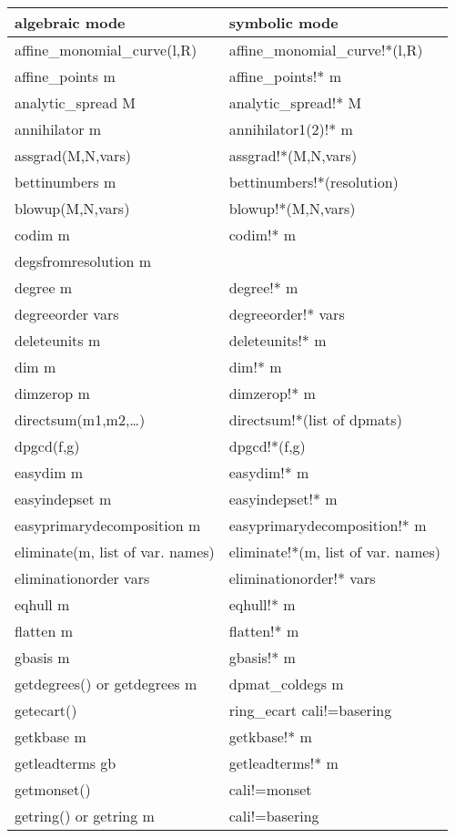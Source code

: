 \begin{tabular}{|p{6cm}|p{7cm}|}
\hline
algebraic mode & symbolic mode\\
\hline
affine\_monomial\_curve(l,R)&affine\_monomial\_curve!*(l,R)\\
affine\_points m& affine\_points!* m\\
analytic\_spread M&analytic\_spread!* M\\
annihilator m& annihilator1(2)!* m\\ 
assgrad(M,N,vars)&assgrad!*(M,N,vars)\\
bettinumbers m& bettinumbers!*(resolution)\\
blowup(M,N,vars)&blowup!*(M,N,vars)\\
codim m&codim!* m\\
degsfromresolution m &\\
degree m& degree!* m \\
degreeorder vars & degreeorder!* vars\\
deleteunits m& deleteunits!* m\\
dim m& dim!* m \\
dimzerop m& dimzerop!* m\\
directsum(m1,m2,\ldots )& directsum!*(list of dpmats)\\
dpgcd(f,g) & dpgcd!*(f,g)\\
easydim m& easydim!* m\\
easyindepset m& easyindepset!* m\\
easyprimarydecomposition m& easyprimarydecomposition!* m\\
eliminate(m, list of var. names)& eliminate!*(m, list of var. names)\\
eliminationorder vars & eliminationorder!* vars \\
eqhull m& eqhull!* m\\
flatten m& flatten!* m\\
gbasis m& gbasis!* m\\
getdegrees() or getdegrees m& dpmat\_coldegs m\\
getecart() & ring\_ecart cali!=basering\\
getkbase m& getkbase!* m\\
getleadterms gb & getleadterms!* m\\
getmonset()&cali!=monset\\
getring() or getring m& cali!=basering\\
\end{tabular}

